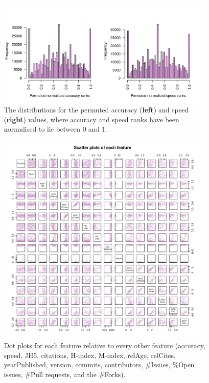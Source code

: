 \documentclass[fleqn,10pt]{SelfArx} %
\begin{document}
\begin{figure}[htb!]
\centering
\includegraphics[width=0.95\textwidth]{supplementary-distributions-permuted.pdf}
\caption{The distributions for the permuted accuracy ({\bf left}) and speed ({\bf right}) values, where accuracy and speed ranks have been normalised to lie between 0 and 1.
}
\label{fig:metricDistributionsPerm}
\end{figure}

\clearpage

\begin{figure}[H]
\centering
\includegraphics[width=0.95\textwidth]{supplementary-figures-pairs.pdf}
\caption{Dot plots for each feature relative to every other feature
  (accuracy, speed, JH5, citations, H-index, M-index, relAge,
  relCites, yearPublished, version, commits, contributors, \#Issues,
\%Open issues, \#Pull requests, and the \#Forks).
}
\label{fig:metricPairs}
\end{figure}
\end{document}
